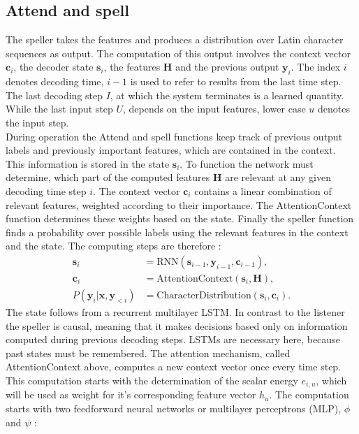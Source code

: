 \documentclass{article}
\begin{document}
\subsection{Attend and spell}
\label{subsec:AttendAndSpell}
The speller takes the features and produces a distribution over Latin character sequences as output. The computation of this output involves the context vector $\mathbf{c}_i$, the decoder state $\mathbf{s}_i$, the features $\mathbf{H}$ and the previous output $\mathbf{y}_i$. The index $i$ denotes decoding time, $i-1$ is used to refer to results from the last time step. The last decoding step $I$, at which the system terminates is a learned quantity. While the last input step $U$, depends on the input features, lower case $u$ denotes the input step.\\
During operation the Attend and spell functions keep track of previous output labels and previously important features, which are contained in the context. This information is stored in the state $\mathbf{s}_i$. To function the network must determine, which part of the computed features $\mathbf{H}$ are relevant at any given decoding time step $i$. The context vector $\mathbf{c}_i$ contains a linear combination of relevant features, weighted according to their importance. The AttentionContext function determines these weights based on the state. Finally the speller function finds a probability over possible labels using the relevant features in the context and the state. The computing steps are therefore \cite{Chan2015}:
\begin{align}
 \mathbf{s}_i &= \text{RNN}(\mathbf{s}_{i-1}, \mathbf{y}_{i-1}, \mathbf{c}_{i-1}), \\
 \mathbf{c}_i &= \text{AttentionContext}(\mathbf{s}_i,\mathbf{H}), \\
  P(\mathbf{y}_i|\mathbf{x}, \mathbf{y}_{<i}) &= \text{CharacterDistribution}(\mathbf{s}_i,\textbf{c}_i).
\end{align}
The state follows from a recurrent multilayer LSTM. In contrast to the listener the speller is causal, meaning that it makes decisions based only on information computed during previous decoding steps. LSTMs are necessary here, because past states must be remembered. The attention mechanism, called AttentionContext above, computes a new context vector once every time step.
This computation starts with the determination of the scalar energy $e_{i,u}$, which will be used as weight for it's corresponding feature vector  $h_u$. The computation starts with two feedforward neural networks or multilayer perceptrons (MLP), $\phi$ and $\psi$ \cite{Chan2015}:
\end{document}

